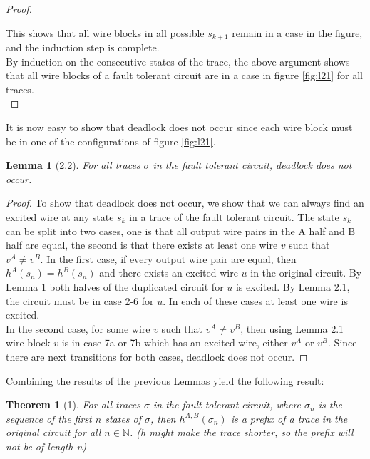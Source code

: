 \documentclass[12pt]{report}
\newtheorem*{theorem}{Theorem}
\newtheorem*{lemma}{Lemma}
\begin{document}
\begin{proof}
\begin{itemize}
\end{itemize}
This shows that all wire blocks in all possible $s_{k+1}$ remain in a case in the figure, and the induction step is complete.\\
By induction on the consecutive states of the trace, the above argument shows that all wire blocks of a fault tolerant circuit are in a case in figure \ref{fig:l21} for all traces. \\
\end{proof}
It is now easy to show that deadlock does not occur since each wire block must be in one of the configurations of figure \ref{fig:l21}.
\begin{lemma}[2.2]
For all traces $\sigma$ in the fault tolerant circuit, deadlock does not occur.
\end{lemma}
\begin{proof}
To show that deadlock does not occur, we show that we can always find an excited wire at any state $s_k$ in a trace of the fault tolerant circuit.  The state $s_k$ can be split into two cases, one is that all output wire pairs in the A half and B half are equal, the second is that there exists at least one wire $v$ such that $v^A\neq v^B$.  In the first case, if every output wire pair are equal, then $h^A(s_n)=h^B(s_n)$ and there exists an excited wire $u$ in the original circuit.  By Lemma 1 both halves of the duplicated circuit for $u$ is excited.  By Lemma 2.1, the circuit must be in case 2-6 for $u$.  In each of these cases at least one wire is excited.  \\
In the second case, for some wire $v$ such that $v^A\neq v^B$, then using Lemma 2.1 wire block $v$ is in case 7a or 7b which has an excited wire, either $v^A$ or $v^B$.  Since there are next transitions for both cases, deadlock does not occur.
\end{proof}

Combining the results of the previous Lemmas yield the following result:
\begin{theorem}[1]
For all traces $\sigma$ in the fault tolerant circuit, where $\sigma_n$ is the sequence of the first $n$ states of $\sigma$, then $h^{A,B}(\sigma_n)$ is a prefix of a trace in the original circuit for all $n \in \mathbb{N}$.  (h might make the trace shorter, so the prefix will not be of length n) %
\end{theorem}
\end{document}
